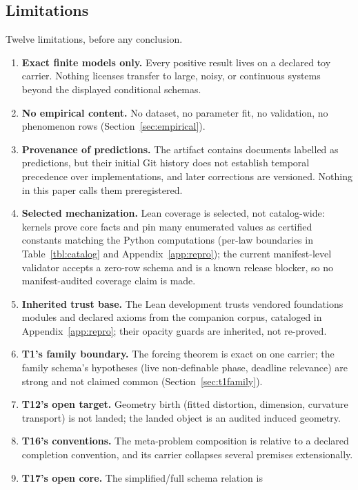 \documentclass[11pt]{article}
\theoremstyle{definition}
\begin{document}
\subsection{Limitations}
\label{sec:limitations}

Twelve limitations, before any conclusion.

\begin{enumerate}
\item \textbf{Exact finite models only.} Every positive result lives on a
declared toy carrier. Nothing licenses transfer to large, noisy, or
continuous systems beyond the displayed conditional schemas.
\item \textbf{No empirical content.} No dataset, no parameter fit, no
validation, no phenomenon rows (Section~\ref{sec:empirical}).
\item \textbf{Provenance of predictions.} The artifact contains documents
labelled as predictions, but their initial Git history does not establish
temporal precedence over implementations, and later corrections are
versioned. Nothing in this paper calls them preregistered.
\item \textbf{Selected mechanization.} Lean coverage is selected, not
catalog-wide: kernels prove core facts and pin many enumerated values as
certified constants matching the Python computations (per-law boundaries in
Table~\ref{tbl:catalog} and Appendix~\ref{app:repro}); the current
manifest-level validator accepts a zero-row schema and is a known release
blocker, so no manifest-audited coverage claim is made.
\item \textbf{Inherited trust base.} The Lean development trusts vendored
foundations modules and declared axioms from the companion corpus, cataloged
in Appendix~\ref{app:repro}; their opacity guards are inherited, not
re-proved.
\item \textbf{T1's family boundary.} The forcing theorem is exact on one
carrier; the family schema's hypotheses (live non-definable phase, deadline
relevance) are strong and not claimed common (Section~\ref{sec:t1family}).
\item \textbf{T12's open target.} Geometry birth (fitted distortion,
dimension, curvature transport) is not landed; the landed object is an
audited induced geometry.
\item \textbf{T16's conventions.} The meta-problem composition is relative
to a declared completion convention, and its carrier collapses several
premises extensionally.
\item \textbf{T17's open core.} The simplified/full schema relation is

\end{enumerate}
\end{document}
